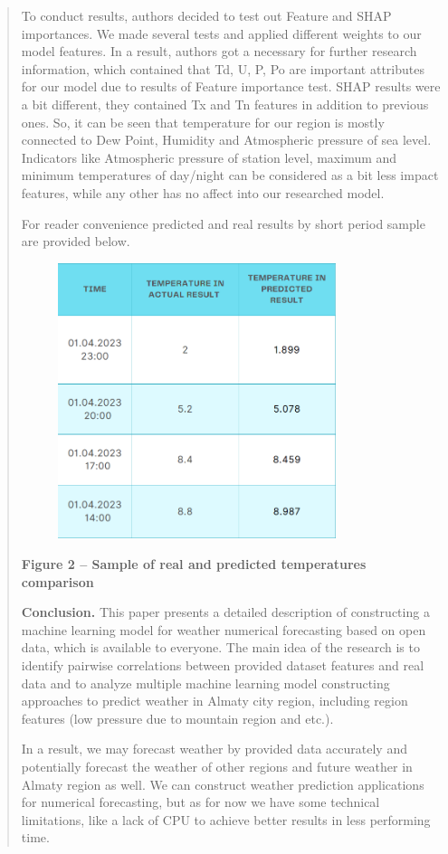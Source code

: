 \begin{quote}
To conduct results, authors decided to test out Feature and SHAP
importances. We made several tests and applied different weights to our
model features. In a result, authors got a necessary for further
research information, which contained that Td, U, P, Po are important
attributes for our model due to results of Feature importance test. SHAP
results were a bit different, they contained Tx and Tn features in
addition to previous ones. So, it can be seen that temperature for our
region is mostly connected to Dew Point, Humidity and Atmospheric
pressure of sea level. Indicators like Atmospheric pressure of station
level, maximum and minimum temperatures of day/night can be considered
as a bit less impact features, while any other has no affect into our
researched model.

For reader convenience predicted and real results by short period sample
are provided below.

\begin{figure}[H]
	\centering
	\includegraphics[width=0.8\textwidth]{assets/37}
	\caption*{}
\end{figure}

\textbf{Figure 2 -- Sample of real and predicted temperatures
comparison}

\textbf{Conclusion.} This paper presents a detailed description of
constructing a machine learning model for weather numerical forecasting
based on open data, which is available to everyone. The main idea of the
research is to identify pairwise correlations between provided dataset
features and real data and to analyze multiple machine learning model
constructing approaches to predict weather in Almaty city region,
including region features (low pressure due to mountain region and
etc.).

In a result, we may forecast weather by provided data accurately and
potentially forecast the weather of other regions and future weather in
Almaty region as well. We can construct weather prediction applications
for numerical forecasting, but as for now we have some technical
limitations, like a lack of CPU to achieve better results in less
performing time.
\end{quote}

